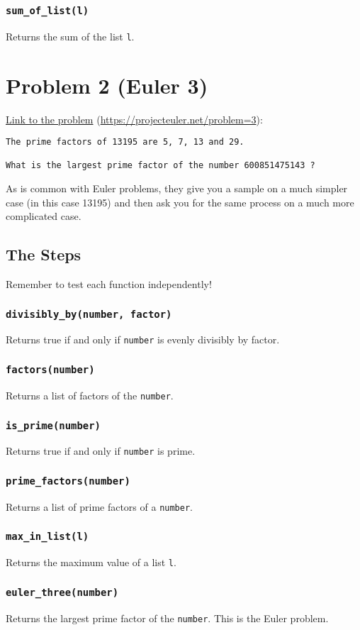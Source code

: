 \documentclass[11pt]{article}
\begin{document}
\subsubsection{\texttt{sum\_of\_list(l)}}
\label{sec:orgafb16ed}
Returns the sum of the list \texttt{l}.\\

\section{Problem 2 (Euler 3)}
\label{sec:orgbb52f8c}
\href{https://projecteuler.net/problem=3}{Link to the problem} (\url{https://projecteuler.net/problem=3}):\\

\begin{verbatim}
The prime factors of 13195 are 5, 7, 13 and 29.

What is the largest prime factor of the number 600851475143 ?
\end{verbatim}

As is common with Euler problems, they give you a sample on a much simpler case (in this case 13195) and then ask you for the same process on a much more complicated case.\\

\subsection{The Steps}
\label{sec:org8866de3}
Remember to test each function independently!\\
\subsubsection{\texttt{divisibly\_by(number, factor)}}
\label{sec:orga6fc0c7}
Returns true if and only if \texttt{number} is evenly divisibly by factor.\\
\subsubsection{\texttt{factors(number)}}
\label{sec:org907023d}
Returns a list of factors of the \texttt{number}.\\
\subsubsection{\texttt{is\_prime(number)}}
\label{sec:orgf8f142e}
Returns true if and only if \texttt{number} is prime.\\
\subsubsection{\texttt{prime\_factors(number)}}
\label{sec:org33e0652}
Returns a list of prime factors of a \texttt{number}.\\
\subsubsection{\texttt{max\_in\_list(l)}}
\label{sec:org3dfd5c2}
Returns the maximum value of a list \texttt{l}.\\
\subsubsection{\texttt{euler\_three(number)}}
\label{sec:orgf82145c}
Returns the largest prime factor of the \texttt{number}.  This is the Euler problem.\\
\end{document}
